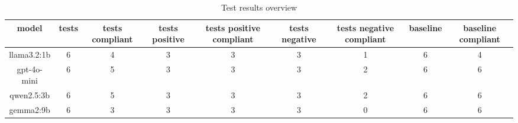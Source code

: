 
  \begin{table}[h!]
  \centering
  \begin{tabular}{|c|c|c|c|c|c|c|c|c|}
  \hline
  model & tests & tests compliant & tests positive & tests positive compliant & tests negative & tests negative compliant & baseline & baseline compliant \\
  \hline
  llama3.2:1b & 6 & 4 & 3 & 3 & 3 & 1 & 6 & 4\\
\hline
gpt-4o-mini & 6 & 5 & 3 & 3 & 3 & 2 & 6 & 6\\
\hline
qwen2.5:3b & 6 & 5 & 3 & 3 & 3 & 2 & 6 & 6\\
\hline
gemma2:9b & 6 & 3 & 3 & 3 & 3 & 0 & 6 & 6
  \end{tabular}
  \caption{Test results overview}
  
  \end{table}
  